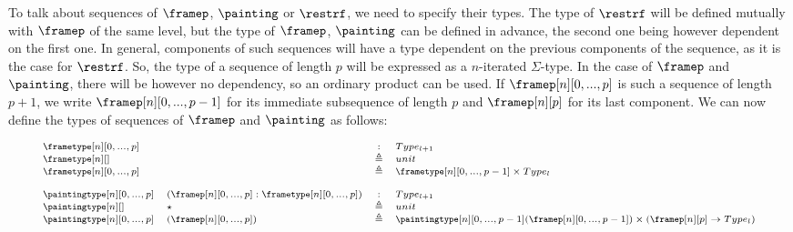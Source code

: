 \documentclass{msc}
\newcommand{\defeq}{\ensuremath{\triangleq}}
\begin{document}
\begin{itemize}
        To talk about sequences of $\framep$, $\painting$ or $\restrf$,
        we need to specify their types. The type of $\restrf$ will be
        defined mutually with $\framep$ of the same level, but the type of
        $\framep$, $\painting$ can be defined in advance, the second one
        being however dependent on the first one. In general, components of
        such sequences will have a type dependent on the previous components
        of the sequence, as it is the case for $\restrf$. So, the type of
        a sequence of length $p$ will be expressed as a $n$-iterated
        $\Sigma$-type. In the case of $\framep$ and $\painting$, there will
        be however no dependency, so an ordinary product can be used. If
        $\framep[n][0,...,p]$ is such a sequence of length $p+1$, we write
        $\framep[n][0,...,p-1]$ for its immediate subsequence of length $p$
        and $\framep[n][p]$ for its last component. We can now define the
        types of sequences of $\framep$ and $\painting$ as follows:

        $$
          \fontsize{7.2}{9}\selectfont
          \begin{array}{llcl}
            \frametype[n][0,...,p]    &                                              & :      & Type_{l+1}                                                                                   \\
            \frametype[n][]           &                                              & \defeq & unit                                                                                         \\
            \frametype[n][0,...,p]    &                                              & \defeq & \frametype[n][0,...,p-1] \times Type_l                                                       \\
            \\
            \paintingtype[n][0,...,p] & (\framep[n][0,...,p]:\frametype[n][0,...,p]) & :      & Type_{l+1}                                                                                   \\
            \paintingtype[n][]        & \star                                        & \defeq & unit                                                                                         \\
            \paintingtype[n][0,...,p] & (\framep[n][0,...,p])                        & \defeq & \paintingtype[n][0,...,p-1](\framep[n][0,...,p-1]) \times (\framep[n][p] \rightarrow Type_l) \\
          \end{array}
        $$


\end{itemize}
\end{document}
